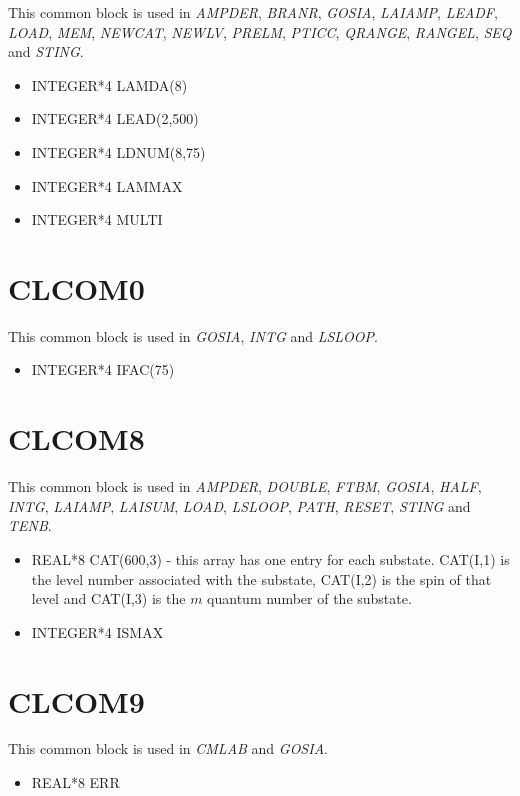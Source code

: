 This common block is used in {\em AMPDER}, {\em BRANR}, {\em GOSIA}, {\em
LAIAMP}, {\em LEADF}, {\em LOAD}, {\em MEM}, {\em NEWCAT}, {\em NEWLV}, {\em
PRELM}, {\em PTICC}, {\em QRANGE}, {\em RANGEL}, {\em SEQ} and {\em STING}.

\begin{itemize}
\item INTEGER*4 LAMDA(8)
\item INTEGER*4 LEAD(2,500)
\item INTEGER*4 LDNUM(8,75)
\item INTEGER*4 LAMMAX
\item INTEGER*4 MULTI
\end{itemize}

\section{CLCOM0}

This common block is used in {\em GOSIA}, {\em INTG} and {\em LSLOOP}.

\begin{itemize}
\item INTEGER*4 IFAC(75)
\end{itemize}

\section{CLCOM8}

This common block is used in {\em AMPDER}, {\em DOUBLE}, {\em FTBM}, {\em
GOSIA}, {\em HALF}, {\em INTG}, {\em LAIAMP}, {\em LAISUM}, {\em LOAD}, {\em
LSLOOP}, {\em PATH}, {\em RESET}, {\em STING} and {\em TENB}.

\begin{itemize}
\item REAL*8 CAT(600,3) - this array has one entry for each substate.
CAT(I,1) is the level number associated with the substate, CAT(I,2) is the
spin of that level and CAT(I,3) is the $m$ quantum number of the substate.
\item INTEGER*4 ISMAX
\end{itemize}

\section{CLCOM9}

This common block is used in {\em CMLAB} and {\em GOSIA}.

\begin{itemize}
\item REAL*8 ERR
\end{itemize}

